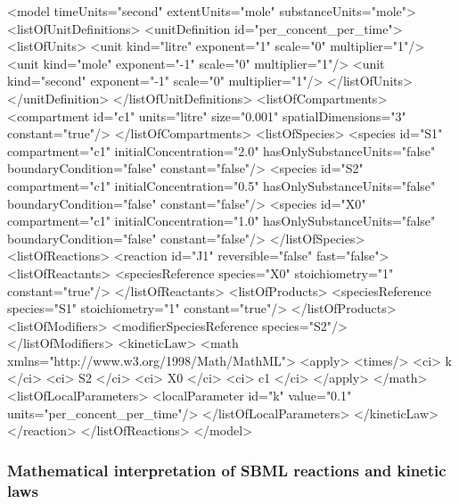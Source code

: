 \begin{example}

<model timeUnits="second" extentUnits="mole" substanceUnits="mole">
    <listOfUnitDefinitions>
        <unitDefinition id="per_concent_per_time">
            <listOfUnits>
                <unit kind="litre"  exponent="1"  scale="0" multiplier="1"/>
                <unit kind="mole"   exponent="-1" scale="0" multiplier="1"/>
                <unit kind="second" exponent="-1" scale="0" multiplier="1"/>
            </listOfUnits>
        </unitDefinition>
    </listOfUnitDefinitions>
    <listOfCompartments>
        <compartment id="c1" units="litre" size="0.001" spatialDimensions="3" constant="true"/>
    </listOfCompartments>
    <listOfSpecies>
        <species id="S1" compartment="c1" initialConcentration="2.0" 
              hasOnlySubstanceUnits="false" boundaryCondition="false" constant="false"/>
        <species id="S2" compartment="c1" initialConcentration="0.5" 
              hasOnlySubstanceUnits="false" boundaryCondition="false" constant="false"/>
        <species id="X0" compartment="c1" initialConcentration="1.0" 
              hasOnlySubstanceUnits="false" boundaryCondition="false" constant="false"/>
    </listOfSpecies>
    <listOfReactions>
        <reaction id="J1" reversible="false" fast="false">
            <listOfReactants>
                <speciesReference species="X0" stoichiometry="1" constant="true"/>
            </listOfReactants>
            <listOfProducts>
                <speciesReference species="S1" stoichiometry="1" constant="true"/>
            </listOfProducts>
            <listOfModifiers>
                <modifierSpeciesReference species="S2"/>
            </listOfModifiers>
            <kineticLaw>
                <math xmlns="http://www.w3.org/1998/Math/MathML">
                    <apply>
                        <times/> <ci> k </ci> <ci> S2 </ci> <ci> X0 </ci> <ci> c1 </ci>
                    </apply>
                </math>
                <listOfLocalParameters>
                    <localParameter id="k" value="0.1" units="per_concent_per_time"/>
                </listOfLocalParameters>
            </kineticLaw>
        </reaction>
    </listOfReactions>
</model>

\end{example}



\subsubsection{Mathematical interpretation of SBML reactions and kinetic laws}
\label{sec:about-kinetic-laws}

